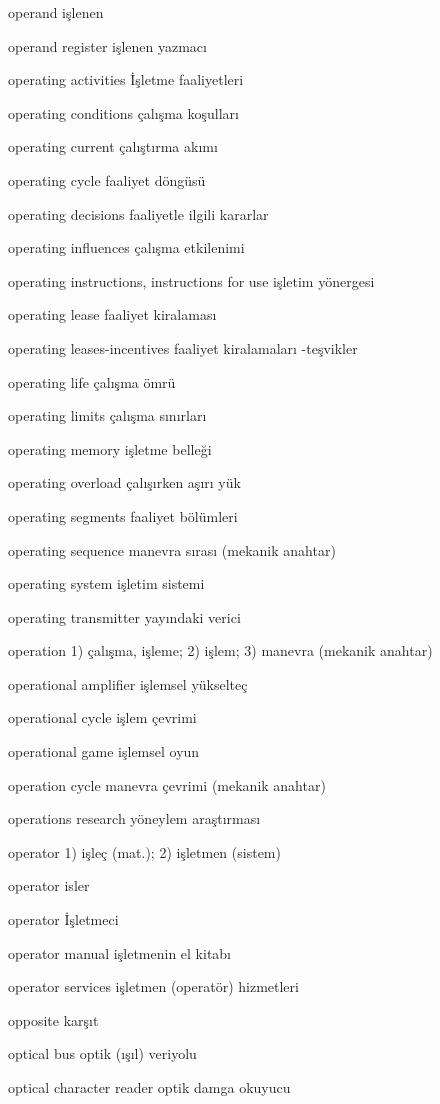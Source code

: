 \documentclass[12pt,fleqn]{article}\usepackage{../../common}
\begin{document}
operand işlenen

operand register işlenen yazmacı

operating activities İşletme faaliyetleri

operating conditions çalışma koşulları

operating current çalıştırma akımı

operating cycle faaliyet döngüsü

operating decisions faaliyetle ilgili kararlar

operating influences çalışma etkilenimi

operating instructions, instructions for use işletim yönergesi

operating lease faaliyet kiralaması

operating leases-incentives faaliyet kiralamaları -teşvikler

operating life çalışma ömrü

operating limits çalışma sınırları

operating memory işletme belleği

operating overload çalışırken aşırı yük

operating segments faaliyet bölümleri

operating sequence manevra sırası (mekanik anahtar)

operating system işletim sistemi

operating transmitter yayındaki verici

operation 1) çalışma, işleme; 2) işlem; 3) manevra (mekanik anahtar)

operational amplifier işlemsel yükselteç

operational cycle işlem çevrimi

operational game işlemsel oyun

operation cycle manevra çevrimi (mekanik anahtar)

operations research yöneylem araştırması

operator 1) işleç (mat.); 2) işletmen (sistem)

operator isler

operator İşletmeci

operator manual işletmenin el kitabı

operator services işletmen (operatör) hizmetleri

opposite karşıt

optical bus optik (ışıl) veriyolu

optical character reader optik damga okuyucu
\end{document}
